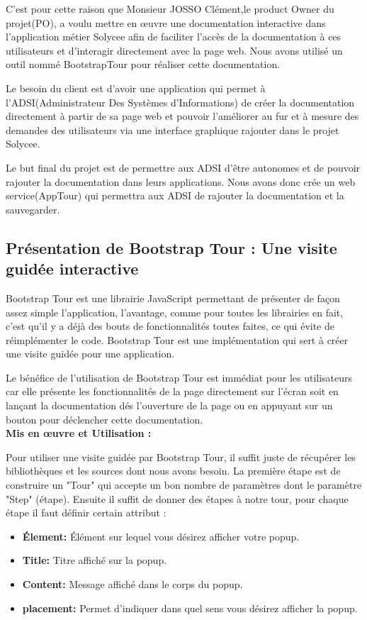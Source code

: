 \documentclass[12pt]{article}
\begin{document}
C'est pour cette raison que Monsieur JOSSO Clément,le product Owner du projet(PO), a voulu mettre en œuvre une documentation interactive dans l'application métier Solycee afin de faciliter l’accès de la documentation à ces utilisateurs et d'interagir directement avec la page web. Nous avons utilisé un outil nommé BootstrapTour pour réaliser cette documentation. 

Le besoin du client est d'avoir une application qui permet à l'ADSI(Administrateur Des Systèmes d'Informations) de créer la documentation directement à partir de sa page web et pouvoir l'améliorer au fur et à mesure des demandes des utilisateurs via une interface graphique rajouter dans le projet Solycee. 


Le but final du projet est de permettre aux ADSI d'être autonomes et de pouvoir rajouter la documentation dans leurs applications. Nous avons donc crée un web service(AppTour) qui permettra aux ADSI de rajouter la documentation et la sauvegarder. 
 
\subsection{Présentation de Bootstrap Tour : Une visite guidée interactive}
 
Bootstrap Tour est une librairie JavaScript permettant de présenter de façon assez simple l’application, l’avantage, comme pour toutes les librairies en fait, c’est qu’il y a déjà des bouts de fonctionnalités toutes faites, ce qui évite de réimplémenter le code. Bootstrap Tour est une implémentation qui sert à créer une visite guidée pour une application.

Le bénéfice de l'utilisation de Bootstrap Tour est immédiat pour les utilisateurs car elle présente les fonctionnalités de la page directement sur l'écran soit en lançant la documentation  dés l'ouverture de la page ou en appuyant sur un bouton pour déclencher cette documentation.\\
\textbf{Mis en œuvre et  Utilisation :}

Pour utiliser une visite guidée par Bootstrap Tour, il suffit juste de récupérer les bibliothèques et les sources dont nous avons besoin. La première étape est de construire un "Tour" qui accepte un bon nombre de paramètres dont le paramètre "Step" (étape). Ensuite il suffit de donner des étapes à notre tour, pour chaque étape il faut définir certain attribut : 

\begin{itemize}
\item \textbf{Élement: } Élément sur lequel vous désirez afficher votre popup. 
\item \textbf{Title: } Titre affiché sur la popup. 
\item \textbf{Content: } Message affiché dans le corps du popup.
\item \textbf{placement: } Permet d’indiquer dans quel sens vous désirez afficher la popup.
\end{itemize} 
\end{document}

